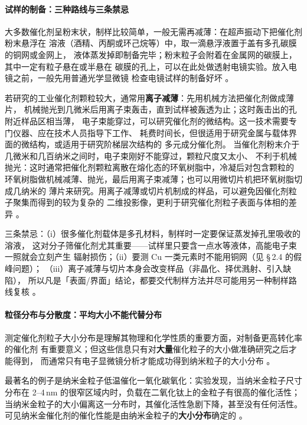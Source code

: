 \paragraph{试样的制备：三种路线与三条禁忌}
大多数催化剂呈粉末状，制样比较简单，一般无需再减薄：在超声振动下把催化剂粉末悬浮在
溶液（酒精、丙酮或环己烷等）中，取一滴悬浮液置于盖有多孔碳膜的铜网或金网上，
液体蒸发掉即制备完毕；粉末粒子会附着在金属网的碳膜上，其中一定有粒子悬在或半悬在
碳膜的孔上，可以在此处做透射电镜实验。放入电镜之前，一般先用普通光学显微镜
检查电镜试样的制备好坏
。

若研究的工业催化剂颗粒较大，通常用\textbf{离子减薄}：先用机械方法把催化剂做成薄片，
机械抛光到几微米后用离子束轰击，直到试样被轰透为止；这时轰击出的孔附近样品区相当薄，
电子束能穿过，可以研究催化剂的微结构。这一技术需要专门仪器、应在技术人员指导下工作、
耗费时间长，但很适用于研究金属与载体界面的微结构，或适用于研究阶梯层次结构的
多元成分催化剂。
当催化剂粉末介于几微米和几百纳米之间时，电子束刚好不能穿过，颗粒尺度又太小、
不利于机械抛光：这时通常把催化剂颗粒离散在熔化态的环氧树脂中，冷凝后对包含颗粒的
环氧树脂做机械减薄、抛光，最后用离子束减薄；也可以用微切片机把环氧树脂切成几纳米的
薄片来研究。用离子减薄或切片机制成的样品，可以避免因催化剂粒子聚集而得到的较为复杂的
二维投影像，更利于研究催化剂粒子表面与体相的差异
。

三条禁忌：（i）很多催化剂载体是多孔材料，制样时一定要保证蒸发掉孔里吸收的溶液，
这对分子筛催化剂尤其重要——试样里只要含一点水等液体，高能电子束一照就会立刻产生
辐射损伤；（ii）要测 Cu 一类元素时不能用铜网（见 \S\,2.4 的假峰问题）；
（iii）离子减薄与切片本身会改变样品（非晶化、择优溅射、引入缺陷），
所以凡是「表面/界面」结论，都要交代制样方法并尽可能用另一种制样路线复核
。

\paragraph{粒径分布与分散度：平均大小不能代替分布}
测定催化剂粒子大小分布是理解其物理和化学性质的重要方面，对制备更高转化率的催化剂
有重要意义；但这些信息只有对\textbf{大量}催化粒子的大小做准确研究之后才能得到，
而通常只有电子显微镜分析才能成功得到纳米粒子的大小分布
。

最著名的例子是纳米金粒子低温催化一氧化碳氧化：实验发现，当纳米金粒子尺寸分布在
2--4\,nm 的很窄区域内时，负载在二氧化钛上的金粒子有很高的催化活性；
当纳米金粒子的大小偏离这一分布时，其催化活性急剧下降，甚至没有任何活性。
可见纳米金催化剂的催化性能是由纳米金粒子的\textbf{大小分布}确定的
。

